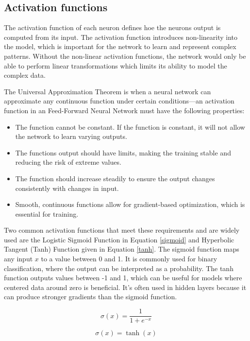 \subsection{Activation functions}
 

The activation function of each neuron defines hoe the neurons output is computed from its input. The activation function introduces non-linearity into the model, which is important for the network to learn and represent complex patterns. Without the non-linear activation functions, the network would only be able to perform linear transformations which limits its ability to model the complex data.  


The Universal Approximation Theorem is when a neural network can approximate any continuous function under certain conditions—an activation function in an Feed-Forward Neural Network must have the following properties:

\begin{itemize}
    \item  The function cannot be constant. If the function is constant, it will not allow the network to learn varying outputs. 
    \item The functions output should have limits, making the training stable and reducing the risk of extreme values. 
    \item The function should increase steadily to ensure the output changes consistently with changes in input. 
    \item Smooth, continuous functions allow for gradient-based optimization, which is essential for training. 
\end{itemize}


Two common activation functions that meet these requirements and are widely used are the Logistic Sigmoid Function in Equation \ref{sigmoid} and Hyperbolic Tangent (Tanh) Function given in Equation \ref{tanh}. The sigmoid function maps any input \( x \) to a value between 0 and 1. It is commonly used for binary classification, where the output can be interpreted as a probability.
The tanh function outputs values between -1 and 1, which can be useful for models where centered data around zero is beneficial. It’s often used in hidden layers because it can produce stronger gradients than the sigmoid function.


\begin{equation}
    \sigma(x) = \frac{1}{1 + e^{-x}}
    \label{sigmoid}
\end{equation}

\begin{equation}
      \sigma(x) = \tanh(x)
      \label{tanh}
\end{equation}


